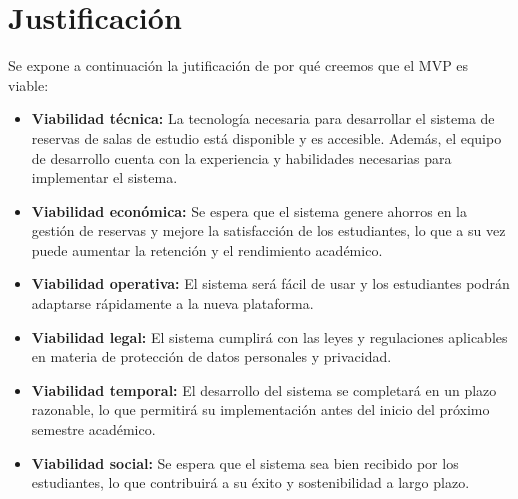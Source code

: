 \documentclass{article}
\begin{document}
      \section{Justificación}

      Se expone a continuación la jutificación de por qué creemos que el MVP es viable:

      \begin{itemize}
        \item \textbf{Viabilidad técnica:} La tecnología necesaria para desarrollar el sistema de reservas de salas de estudio está disponible y es accesible. Además, el equipo de desarrollo cuenta con la experiencia y habilidades necesarias para implementar el sistema.
        \item \textbf{Viabilidad económica:} Se espera que el sistema genere ahorros en la gestión de reservas y mejore la satisfacción de los estudiantes, lo que a su vez puede aumentar la retención y el rendimiento académico.
        \item \textbf{Viabilidad operativa:} El sistema será fácil de usar y los estudiantes podrán adaptarse rápidamente a la nueva plataforma.
        \item \textbf{Viabilidad legal:} El sistema cumplirá con las leyes y regulaciones aplicables en materia de protección de datos personales y privacidad.
        \item \textbf{Viabilidad temporal:} El desarrollo del sistema se completará en un plazo razonable, lo que permitirá su implementación antes del inicio del próximo semestre académico.
        \item \textbf{Viabilidad social:} Se espera que el sistema sea bien recibido por los estudiantes, lo que contribuirá a su éxito y sostenibilidad a largo plazo.
        \end{itemize}


        \newpage
\end{document}
